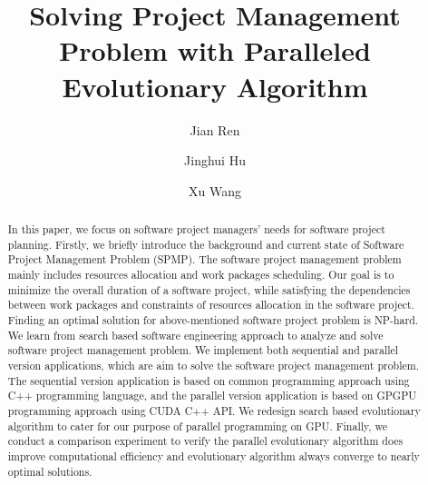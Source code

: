 \tableofcontents
%
\mainmatter              %
%
\title{Solving Project Management Problem with Paralleled Evolutionary Algorithm}
%
%
\author{Jian Ren \and Jinghui Hu \and Xu Wang}
%
%
%

\maketitle

\begin{abstract}
In this paper, we focus on software project managers’ needs for
software project planning. Firstly, we briefly introduce
the background and current state of Software Project Management Problem (SPMP).
The software project management problem mainly includes resources allocation
and work packages scheduling. Our goal is to minimize the overall duration of a software
project, while satisfying the dependencies between work packages and constraints of resources
allocation in the software project. Finding an optimal solution for above-mentioned software
project problem is NP-hard. We learn from search based software engineering approach to
analyze and solve software project management problem. We implement both sequential and
parallel version applications, which are aim to solve the software project management
problem. The sequential version application is based on common programming approach using
C++ programming language, and the parallel version application is based on GPGPU programming
approach using CUDA C++ API. We redesign search based evolutionary algorithm to cater for our
purpose of parallel programming on GPU. Finally, we conduct a comparison experiment to verify
the parallel evolutionary algorithm does improve computational efficiency and evolutionary
algorithm always converge to nearly optimal solutions. 
\end{abstract}
